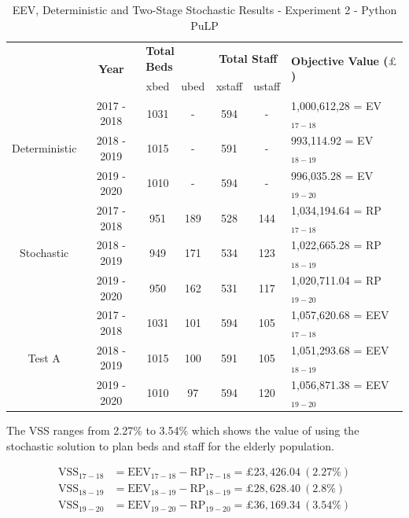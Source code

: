 \documentclass[../thesis.tex]{subfiles}
\begin{document}
\begin{table}[h!]
    \centering
    \begin{tabular}{ccccccl}\toprule
 & \multirow{2}{*}{\textbf{Year}}& \multicolumn{2}{l}{\textbf{Total Beds}} & \multicolumn{2}{c}{\textbf{Total Staff}} & \multirow{2}{*}{\textbf{Objective Value ($\pounds$)}}\\ \cmidrule(lr){3-4} \cmidrule(lr){5-6}
&& xbed           & ubed          & xstaff         & ustaff         \\ \midrule
     \multirow{3}{*}{Deterministic} & 2017 - 2018 & 1031 & - &  594 & - & 1,000,612,28 =  EV$_{17-18}$ \\ 
      & 2018 - 2019 & 1015 & - & 591 & - & 993,114.92 =  EV$_{18-19}$ \\
      & 2019 - 2020 & 1010 & - & 594 & - & 996,035.28 =  EV$_{19-20}$\\\midrule
     \multirow{3}{*}{Stochastic} & 2017 - 2018 & 951 & 189 & 528 & 144 & 1,034,194.64 =  RP$_{17-18}$ \\ 
      & 2018 - 2019 & 949 & 171 & 534 & 123 & 1,022,665.28 =  RP$_{18-19}$ \\
      & 2019 - 2020 & 950 & 162 & 531 & 117 & 1,020,711.04 =  RP$_{19-20}$\\ \midrule
      \multirow{3}{*}{Test A} & 2017 - 2018 &1031 & 101 & 594 & 105 & 1,057,620.68 = EEV$_{17-18}$\\
      & 2018 - 2019 &1015 & 100 & 591 & 105 & 1,051,293.68 = EEV$_{18-19}$\\
      & 2019 - 2020 &1010 & 97 & 594 & 120 & 1,056,871.38 = EEV$_{19-20}$\\\bottomrule      
    \end{tabular}
    \caption{EEV, Deterministic and Two-Stage Stochastic Results - Experiment 2 - Python PuLP}
    \label{tab:eevdetstocresultspy2}
\end{table}

The VSS ranges from 2.27\% to 3.54\% which shows the value of using the stochastic solution to plan beds and staff for the elderly population.

\begin{align}
    \text{VSS}_{17-18} &= \text{EEV}_{17-18} - \text{RP}_{17-18} = \pounds23,426.04 \ (2.27\%)  \\
    \text{VSS}_{18-19} &= \text{EEV}_{18-19} - \text{RP}_{18-19} = \pounds28,628.40 \ (2.8\%)  \\
    \text{VSS}_{19-20} &= \text{EEV}_{19-20} - \text{RP}_{19-20} = \pounds36,169.34 \ (3.54\%)  
\end{align}
\end{document}
